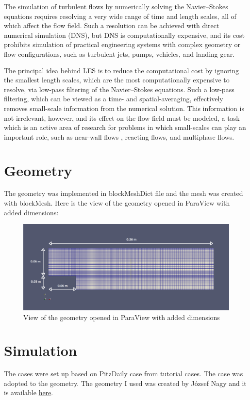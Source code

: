 \documentclass[a4paper]{article}
\begin{document}
The simulation of turbulent flows by numerically solving the Navier–Stokes equations requires resolving a very wide range of time and length scales, all of which affect the flow field. Such a resolution can be achieved with direct numerical simulation (DNS), but DNS is computationally expensive, and its cost prohibits simulation of practical engineering systems with complex geometry or flow configurations, such as turbulent jets, pumps, vehicles, and landing gear.

The principal idea behind LES is to reduce the computational cost by ignoring the smallest length scales, which are the most computationally expensive to resolve, via low-pass filtering of the Navier–Stokes equations. Such a low-pass filtering, which can be viewed as a time- and spatial-averaging, effectively removes small-scale information from the numerical solution. This information is not irrelevant, however, and its effect on the flow field must be modeled, a task which is an active area of research for problems in which small-scales can play an important role, such as near-wall flows , reacting flows, and multiphase flows.
\section{Geometry}

The geometry was implemented in blockMeshDict file and the mesh was created with blockMesh. Here is the view of the geometry opened in ParaView with added dimensions:
\begin{figure}[h!]
\centering
\includegraphics[scale=0.7]{geometry}
\caption{View of the geometry opened in ParaView with added dimensions}
\label{fig:geometry}
\end{figure}

\section{Simulation}
The cases were set up based on PitzDaily case from tutorial cases. The case was adopted to the geometry. The geometry I used was created by József Nagy and it is available \href{https://github.com/jnmlujnmlu/OpenFOAMTeaching/tree/master/JozsefNagy}{here}.
\end{document}
